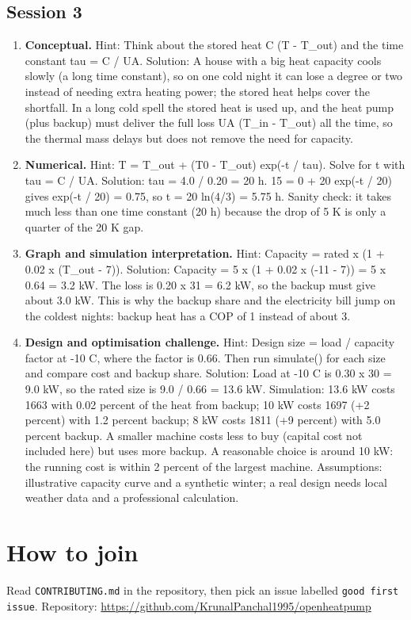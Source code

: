 \documentclass[11pt,a4paper]{article}
\begin{document}
\subsection*{Session 3}
\begin{enumerate}[nosep]
\item \textbf{Conceptual.} Hint: Think about the stored heat C (T - T\_out) and the time constant tau = C / UA. Solution: A house with a big heat capacity cools slowly (a long time constant), so on one cold night it can lose a degree or two instead of needing extra heating power; the stored heat helps cover the shortfall. In a long cold spell the stored heat is used up, and the heat pump (plus backup) must deliver the full loss UA (T\_in - T\_out) all the time, so the thermal mass delays but does not remove the need for capacity.
\item \textbf{Numerical.} Hint: T = T\_out + (T0 - T\_out) exp(-t / tau). Solve for t with tau = C / UA. Solution: tau = 4.0 / 0.20 = 20 h. 15 = 0 + 20 exp(-t / 20) gives exp(-t / 20) = 0.75, so t = 20 ln(4/3) = 5.75 h. Sanity check: it takes much less than one time constant (20 h) because the drop of 5 K is only a quarter of the 20 K gap.
\item \textbf{Graph and simulation interpretation.} Hint: Capacity = rated x (1 + 0.02 x (T\_out - 7)). Solution: Capacity = 5 x (1 + 0.02 x (-11 - 7)) = 5 x 0.64 = 3.2 kW. The loss is 0.20 x 31 = 6.2 kW, so the backup must give about 3.0 kW. This is why the backup share and the electricity bill jump on the coldest nights: backup heat has a COP of 1 instead of about 3.
\item \textbf{Design and optimisation challenge.} Hint: Design size = load / capacity factor at -10 C, where the factor is 0.66. Then run simulate() for each size and compare cost and backup share. Solution: Load at -10 C is 0.30 x 30 = 9.0 kW, so the rated size is 9.0 / 0.66 = 13.6 kW. Simulation: 13.6 kW costs 1663 with 0.02 percent of the heat from backup; 10 kW costs 1697 (+2 percent) with 1.2 percent backup; 8 kW costs 1811 (+9 percent) with 5.0 percent backup. A smaller machine costs less to buy (capital cost not included here) but uses more backup. A reasonable choice is around 10 kW: the running cost is within 2 percent of the largest machine. Assumptions: illustrative capacity curve and a synthetic winter; a real design needs local weather data and a professional calculation.
\end{enumerate}

\section{How to join}
Read \texttt{CONTRIBUTING.md} in the repository, then pick an issue labelled \texttt{good first issue}. Repository: \url{https://github.com/KrunalPanchal1995/openheatpump}
\end{document}
